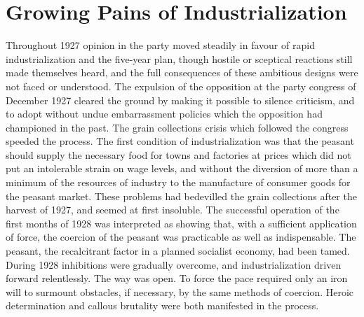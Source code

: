 \chapter{Growing Pains of Industrialization}

Throughout 1927 opinion in the party moved steadily in favour of rapid industrialization and the five-year plan, though hostile or sceptical reactions still made themselves heard, and the full consequences of these ambitious designs were not faced or understood. The expulsion of the opposition at the party congress of December 1927 cleared the ground by making it possible to silence criticism, and to adopt without undue embarrassment policies which the opposition had championed in the past. The grain collections crisis which followed the congress speeded the process. The first condition of industrialization was that the peasant should supply the necessary food for towns and factories at prices which did not put an intolerable strain on wage levels, and without the diversion of more than a minimum of the resources of industry to the manufacture of consumer goods for the peasant market. These problems had bedevilled the grain collections after the harvest of 1927, and seemed at first insoluble. The successful operation of the first months of 1928 was interpreted as showing that, with a sufficient application of force, the coercion of the peasant was practicable as well as indispensable. The peasant, the recalcitrant factor in a planned socialist economy, had been tamed. During 1928 inhibitions were gradually overcome, and industrialization driven forward relentlessly. The way was open. To force the pace required only an iron will to surmount obstacles, if necessary, by the same methods of coercion. Heroic determination and callous brutality were both manifested in the process. 


